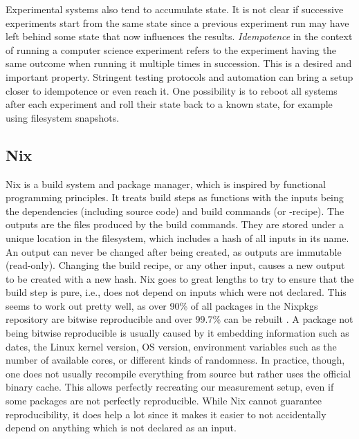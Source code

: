 Experimental systems also tend to accumulate state.
It is not clear if successive experiments start from the same state since a previous experiment run may have left behind some state that now influences the results.
\textit{Idempotence} \cite{wiki:Idempotence} in the context of running a computer science experiment refers to the experiment having the same outcome when running it multiple times in succession.
This is a desired and important property.
Stringent testing protocols and automation can bring a setup closer to idempotence or even reach it.
One possibility is to reboot all systems after each experiment and roll their state back to a known state, for example using filesystem snapshots.
\subsection{Nix}
\label{Nix-explanation}
Nix is a build system and package manager, which is inspired by functional programming principles.
It treats build steps as functions with the inputs being the dependencies (including source code) and build commands (or -recipe).
The outputs are the files produced by the build commands.
They are stored under a unique location in the filesystem, which includes a hash of all inputs in its name.
An output can never be changed after being created, as outputs are immutable (read-only).
Changing the build recipe, or any other input, causes a new output to be created with a new hash.
Nix goes to great lengths to try to ensure that the build step is pure, i.e., does not depend on inputs which were not declared.
This seems to work out pretty well, as over 90\% of all packages in the Nixpkgs repository are bitwise reproducible and over 99.7\% can be rebuilt \cite{malka:hal-04913007}.
A package not being bitwise reproducible is usually caused by it embedding information such as dates, the Linux kernel version, OS version, environment variables such as the number of available cores, or different kinds of randomness.
In practice, though, one does not usually recompile everything from source but rather uses the official binary cache.
This allows perfectly recreating our measurement setup, even if some packages are not perfectly reproducible.
While Nix cannot guarantee reproducibility, it does help a lot since it makes it easier to not accidentally depend on anything which is not declared as an input.


